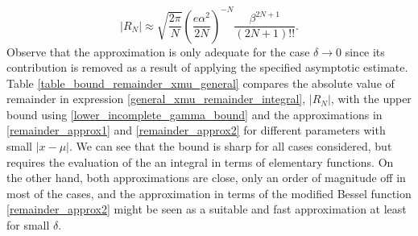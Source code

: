 \documentclass[10pt,a4paper,oneside]{article}
\numberwithin{equation}{section}
\begin{document}
\begin{equation}
|R_N| \approx \sqrt{\frac{2\pi}{N}} \left(\frac{e\alpha^2}{2N}\right)^{-N} \frac{\beta^{2N + 1}}{(2N + 1)!!}.
\end{equation}
Observe that the approximation is only adequate for the case $\delta \to 0$ since its contribution is removed as a result of applying the specified asymptotic estimate. Table \ref{table_bound_remainder_xmu_general} compares the absolute value of remainder in expression \eqref{general_xmu_remainder_integral}, $|R_N|$, with the upper bound using \eqref{lower_incomplete_gamma_bound} and the approximations in \eqref{remainder_approx1} and \eqref{remainder_approx2} for different parameters with small $|x-\mu|$. We can see that the bound is sharp for all cases considered, but requires the evaluation of the an integral in terms of elementary functions. On the other hand, both approximations are close, only an order of magnitude off in most of the cases, and the approximation in terms of the modified Bessel function \eqref{remainder_approx2} might be seen as a suitable and fast approximation at least for small $\delta$.

\begin{table}[H]
	\centering
	\caption{Comparison of various approximations (\eqref{remainder_approx1} and \eqref{remainder_approx2}) and the upper bound \eqref{lower_incomplete_gamma_bound} for the estimation of the remainder \eqref{general_xmu_remainder_integral}.}
	\label{table_bound_remainder_xmu_general}
\end{table}
\end{document}
